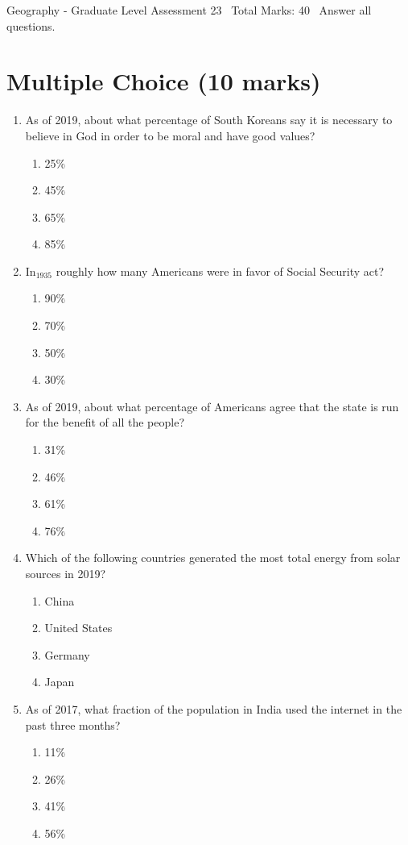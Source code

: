 \documentclass[12pt]{article}
\begin{document}
\begin{center}
Geography - Graduate Level Assessment 23 \
Total Marks: 40 \
Answer all questions.
\end{center}

\section*{Multiple Choice (10 marks)}
\begin{enumerate}[label=\arabic*.]
\item As of 2019, about what percentage of South Koreans say it is necessary to believe in God in order to be moral and have good values?
\begin{enumerate}[label=(\alph*)]
    \item 25\%
    \item 45\%
    \item 65\%
    \item 85\%
\end{enumerate}
\item In$_{1935}$ roughly how many Americans were in favor of Social Security act?
\begin{enumerate}[label=(\alph*)]
    \item 90\%
    \item 70\%
    \item 50\%
    \item 30\%
\end{enumerate}
\item As of 2019, about what percentage of Americans agree that the state is run for the benefit of all the people?
\begin{enumerate}[label=(\alph*)]
    \item 31\%
    \item 46\%
    \item 61\%
    \item 76\%
\end{enumerate}
\item Which of the following countries generated the most total energy from solar sources in 2019?
\begin{enumerate}[label=(\alph*)]
    \item China
    \item United States
    \item Germany
    \item Japan
\end{enumerate}
\item As of 2017, what fraction of the population in India used the internet in the past three months?
\begin{enumerate}[label=(\alph*)]
    \item 11\%
    \item 26\%
    \item 41\%
    \item 56\%
\end{enumerate}
\end{enumerate}
\end{document}
